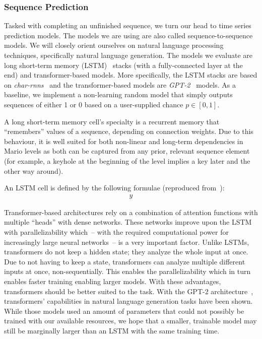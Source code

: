 \subsubsection{Sequence Prediction}

Tasked with completing an unfinished sequence, we turn our head to
time series prediction models. The models we are using are also called
sequence-to-sequence models. We will closely orient ourselves on
natural language processing techniques, specifically natural language
generation. The models we evaluate are long short-term memory
(LSTM)~\cite{hochreiterLongShorttermMemory1997} stacks (with a
fully-connected layer at the end) and transformer-based models. More
specifically, the LSTM stacks are based on
\emph{char-rnns}~\cite{andrejKarpathyCharrnn2019} and the
transformer-based models are
\emph{GPT-2}~\cite{radfordLanguageModelsAre,OpenaiGpt22019} models. As
a baseline, we implement a non-learning random model that simply
outputs sequences of either 1 or 0 based on a user-supplied chance
$p \in [0, 1]$.

A long short-term memory cell's specialty is a recurrent memory that
``remembers'' values of a sequence, depending on connection weights.
Due to this behaviour, it is well suited for both non-linear and
long-term dependencies in Mario levels as both can be captured from
any prior, relevant sequence element (for example, a keyhole at the
beginning of the level implies a key later and the other way around).

An LSTM cell is defined by the following formulae (reproduced from~\cite{hochreiterLongShorttermMemory1997}):
\begin{align*}
  y
\end{align*}

Transformer-based architectures rely on a combination of attention
functions with multiple ``heads'' with dense networks. These networks
improve upon the LSTM with parallelizability which~-- with the
required computational power for increasingly large neural networks~--
is a very important factor. Unlike LSTMs, transformers do not keep a
hidden state; they analyze the whole input at once. Due to not having
to keep a state, transformers can analyze multiple different inputs at
once, non-sequentially. This enables the parallelizability which in
turn enables faster training enabling larger models. With these
advantages, transformers should be better suited to the task. With the
GPT-2 architecture~\cite{radfordLanguageModelsAre}, transformers'
capabilities in natural language generation tasks have been shown.
While those models used an amount of parameters that could not
possibly be trained with our available resources, we hope that a
smaller, trainable model may still be marginally larger than an LSTM
with the same training time.

